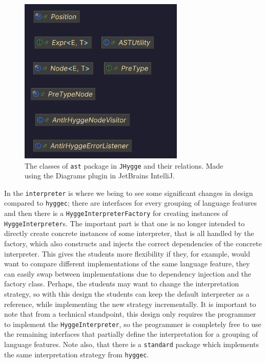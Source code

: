 \begin{figure}[H]
\centering
\includegraphics[width=0.7\textwidth]{Pictures/Diagrams/ast_classes.png}
\caption{The classes of \texttt{ast} package in \texttt{JHygge} and their relations. Made using the Diagrams plugin in JetBrains IntelliJ.}
\label{fig:ast_classes}
\end{figure}

In the \texttt{interpreter} is where we being to see some significant changes in design compared to \texttt{hyggec}; there are interfaces for
every grouping of language features and then there is a \texttt{HyggeInterpreterFactory} for creating instances of \texttt{HyggeInterpreter}s.
The important part is that one is no longer intended to directly create concrete instances of some interpreter, that is all handled by
the factory, which also constructs and injects the correct dependencies of the concrete interpreter. This gives the students more flexibility
if they, for example, would want to compare different implementations of the same language feature, they can easily swap between implementations
due to dependency injection and the factory class. Perhaps, the students may want to change the interpretation strategy, so with this design
the students can keep the default interpreter as a reference, while implementing the new strategy incrementally. It is important to note that
from a technical standpoint, this design only requires the programmer to implement the \texttt{HyggeInterpreter}, so the programmer is completely
free to use the remaining interfaces that partially define the interpretation for a grouping of language features. Note also, that there is a
\texttt{standard} package which implements the same interpretation strategy from \texttt{hyggec}.

